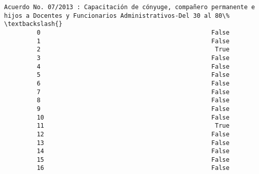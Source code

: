 \documentclass[11pt]{article}
\begin{document}
\begin{Verbatim}[commandchars=\\\{\}]
             Acuerdo No. 07/2013 : Capacitación de cónyuge, compañero permanente e hijos a Docentes y Funcionarios Administrativos-Del 30 al 80\%   \textbackslash{}
         0                                               False                                                                                      
         1                                               False                                                                                      
         2                                                True                                                                                      
         3                                               False                                                                                      
         4                                               False                                                                                      
         5                                               False                                                                                      
         6                                               False                                                                                      
         7                                               False                                                                                      
         8                                               False                                                                                      
         9                                               False                                                                                      
         10                                              False                                                                                      
         11                                               True                                                                                      
         12                                              False                                                                                      
         13                                              False                                                                                      
         14                                              False                                                                                      
         15                                              False                                                                                      
         16                                              False                                                                                      

\end{Verbatim}
\end{document}
